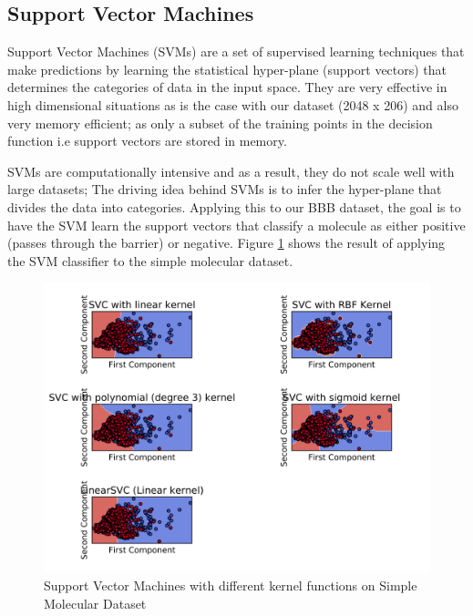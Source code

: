 \documentclass[a4paper,12pt]{report}
\begin{document}
		
		
		\subsection{Support Vector Machines}
		Support Vector Machines (SVMs) are a set of supervised learning techniques that make predictions by learning the statistical hyper-plane (support vectors) that determines the categories of data in the input space. They are very effective in high dimensional situations as is the case with our dataset (2048 x 206) and also very memory efficient; as only a subset of the training points in the decision function i.e support vectors are stored in memory. 
		
		SVMs are computationally intensive and as a result, they do not scale well with large datasets; The driving idea behind SVMs is to infer the hyper-plane that divides the data into categories. Applying this to our BBB dataset, the goal is to have the SVM learn the support vectors that classify a molecule as either positive (passes through the barrier) or negative. Figure \ref{fig:svm_mol} shows the result of applying the SVM classifier to the simple molecular dataset.
		\begin{figure}[H]
			\centering
			\includegraphics[width=\textwidth,scale=1,totalheight=0.4\textheight]{images/mol_decision_svm}
			\caption{Support Vector Machines with different kernel functions on Simple Molecular Dataset}
			\label{fig:svm_mol}
		\end{figure}
		
\end{document}
